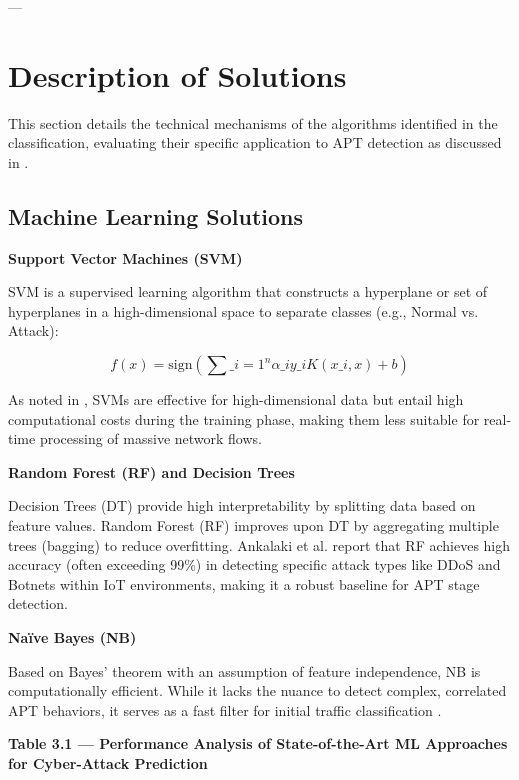 ---

\section{Description of Solutions}

This section details the technical mechanisms of the algorithms identified in the classification, evaluating their specific application to APT detection as discussed in \cite{ankalaki2025cyber}.

\subsection{Machine Learning Solutions}

\textbf{Support Vector Machines (SVM)}

SVM is a supervised learning algorithm that constructs a hyperplane or set of hyperplanes in a high-dimensional space to separate classes (e.g., Normal vs. Attack):

\[f(x) = \text{sign}\!\left(\sum\_{i=1}^{n} \alpha\_i y\_i K(x\_i, x) + b\right)\]

As noted in \cite{ankalaki2025cyber}, SVMs are effective for high-dimensional data but entail high computational costs during the training phase, making them less suitable for real-time processing of massive network flows.

\textbf{Random Forest (RF) and Decision Trees}

Decision Trees (DT) provide high interpretability by splitting data based on feature values. Random Forest (RF) improves upon DT by aggregating multiple trees (bagging) to reduce overfitting. Ankalaki et al. \cite{ankalaki2025cyber} report that RF achieves high accuracy (often exceeding 99\%) in detecting specific attack types like DDoS and Botnets within IoT environments, making it a robust baseline for APT stage detection.

\textbf{Naïve Bayes (NB)}

Based on Bayes' theorem with an assumption of feature independence, NB is computationally efficient. While it lacks the nuance to detect complex, correlated APT behaviors, it serves as a fast filter for initial traffic classification \cite{ankalaki2025cyber}.

\textbf{Table 3.1 — Performance Analysis of State-of-the-Art ML Approaches for Cyber-Attack Prediction \cite{ankalaki2025cyber}}

